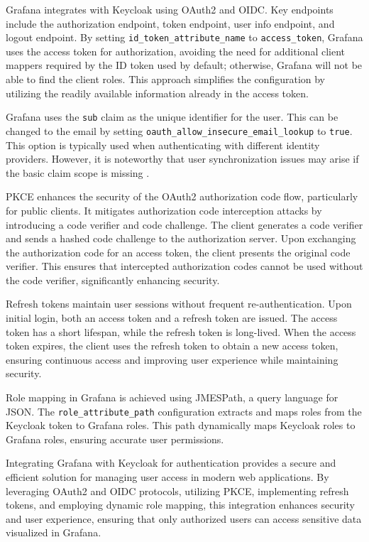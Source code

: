 Grafana integrates with Keycloak using OAuth2 and OIDC. Key endpoints include the authorization endpoint, token endpoint, user info endpoint, and logout endpoint. By setting \texttt{id\_token\_attribute\_name} to \texttt{access\_token}, Grafana uses the access token for authorization, avoiding the need for additional client mappers required by the ID token used by default; otherwise, Grafana will not be able to find the client roles. This approach simplifies the configuration by utilizing the readily available information already in the access token.

Grafana uses the \texttt{sub} claim as the unique identifier for the user. This can be changed to the email by setting \texttt{oauth\_allow\_insecure\_email\_lookup} to \texttt{true}. This option is typically used when authenticating with different identity providers. However, it is noteworthy that user synchronization issues may arise if the basic claim scope is missing \parencite{grafana_authentication}.

PKCE enhances the security of the OAuth2 authorization code flow, particularly for public clients. It mitigates authorization code interception attacks by introducing a code verifier and code challenge. The client generates a code verifier and sends a hashed code challenge to the authorization server. Upon exchanging the authorization code for an access token, the client presents the original code verifier. This ensures that intercepted authorization codes cannot be used without the code verifier, significantly enhancing security.

Refresh tokens maintain user sessions without frequent re-authentication. Upon initial login, both an access token and a refresh token are issued. The access token has a short lifespan, while the refresh token is long-lived. When the access token expires, the client uses the refresh token to obtain a new access token, ensuring continuous access and improving user experience while maintaining security.

Role mapping in Grafana is achieved using JMESPath, a query language for JSON. The \texttt{role\_attribute\_path} configuration extracts and maps roles from the Keycloak token to Grafana roles. This path dynamically maps Keycloak roles to Grafana roles, ensuring accurate user permissions.

Integrating Grafana with Keycloak for authentication provides a secure and efficient solution for managing user access in modern web applications. By leveraging OAuth2 and OIDC protocols, utilizing PKCE, implementing refresh tokens, and employing dynamic role mapping, this integration enhances security and user experience, ensuring that only authorized users can access sensitive data visualized in Grafana.

